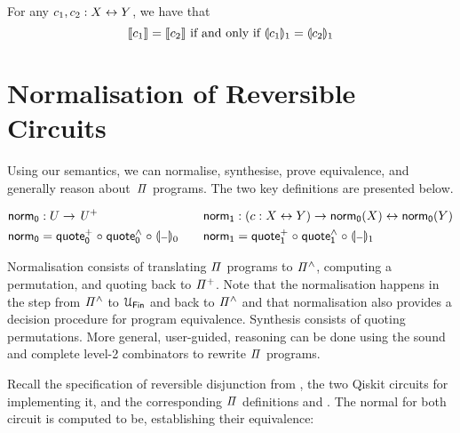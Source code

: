 \begin{theorem}
  For any $c_1, c_2 : X \mathrel{\leftrightarrow} Y$, we have that
  \[
    \llbracket c_1\rrbracket = \llbracket c_2\rrbracket \text{ if and only if } \llparenthesis c_1\rrparenthesis_{1} = \llparenthesis c_2\rrparenthesis_{1}
  \]
\end{theorem}

\section{Normalisation of Reversible Circuits}
\label{sec:applications}

Using our semantics, we can normalise, synthesise, prove equivalence, and generally reason about~$\mathit{\Pi}$
programs. The two key definitions are presented below.

\begin{definition}
  \begin{gather*}
    \begin{aligned}
      \normt_{0} & : U \to \UPlus                                            \\
      \normt_{0} & = \quotep_{0} \comp \quoteh_{0} \comp \gdenot{\blank}_{0}
    \end{aligned}
    \qquad
    \begin{aligned}
      \normt_{1} & : (c : X \iso Y) \to \normt_{0}(X) \iso \normt_{0}(Y)     \\
      \normt_{1} & = \quotep_{1} \comp \quoteh_{1} \comp \gdenot{\blank}_{1}
    \end{aligned}
  \end{gather*}
\end{definition}

\noindent Normalisation consists of translating $\mathit{\Pi}$ programs to $\mathit{{\Pi}^{\wedge}}$, computing a permutation, and quoting
back to $\mathit{{\Pi}^{+}}$. Note that the normalisation happens in the step from $\mathit{{\Pi}^{\wedge}}$ to $\UFin$ and back to
$\mathit{{\Pi}^{\wedge}}$ and that normalisation also provides a decision procedure for program equivalence. Synthesis consists of
quoting permutations. More general, user-guided, reasoning can be done using the sound and complete level-2
combinators to rewrite $\mathit{\Pi}$ programs.

Recall the specification of reversible disjunction from , the two Qiskit circuits for implementing it, and the
corresponding $\mathit{\Pi}$ definitions  and . The normal for both circuit is
computed to be, establishing their equivalence:

